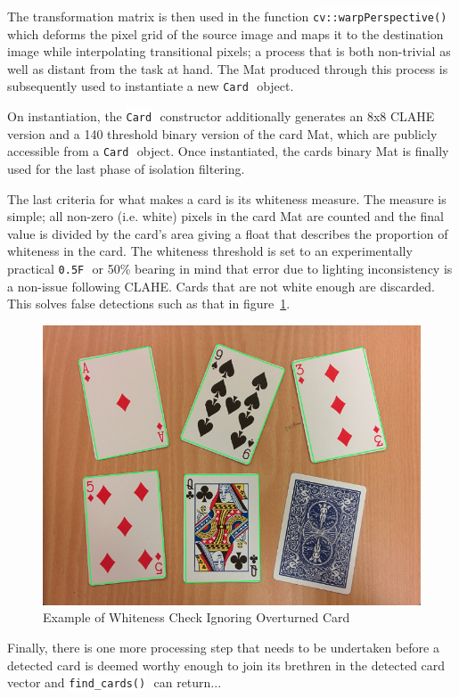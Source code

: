 \documentclass[a4paper,12pt,notitlepage]{article}
\newcommand{\code}[1]{\colorbox{white}{\lstinline[basicstyle=\ttfamily\color{black}]|#1|} }
\begin{document}
			The transformation matrix is then used in the function \code{cv::warpPerspective()} which deforms the pixel grid of the source image and maps it to the destination image while interpolating transitional pixels; a process that is both non-trivial as well as distant from the task at hand. The Mat produced through this process is subsequently used to instantiate a new \code{Card} object.

			On instantiation, the \code{Card} constructor additionally generates an 8x8 CLAHE version and a 140 threshold binary version of the card Mat, which are publicly accessible from a \code{Card} object. Once instantiated, the cards binary Mat is finally used for the last phase of isolation filtering.

			The last criteria for what makes a card is its whiteness measure. The measure is simple; all non-zero (i.e. white) pixels in the card Mat are counted and the final value is divided by the card's area giving a float that describes the proportion of whiteness in the card. The whiteness threshold is set to an experimentally practical \code{0.5F} or 50\% bearing in mind that error due to lighting inconsistency is a non-issue following CLAHE. Cards that are not white enough are discarded. This solves false detections such as that in figure~\ref{fig:whiteness}.

			\begin{figure}[ht]
				\centering
				\includegraphics[width=0.9\linewidth]{whiteness}
				\caption{Example of Whiteness Check Ignoring Overturned Card}
				\label{fig:whiteness}
			\end{figure}

			Finally, there is one more processing step that needs to be undertaken before a detected card is deemed worthy enough to join its brethren in the detected card vector and \code{find_cards()} can return...
\end{document}
